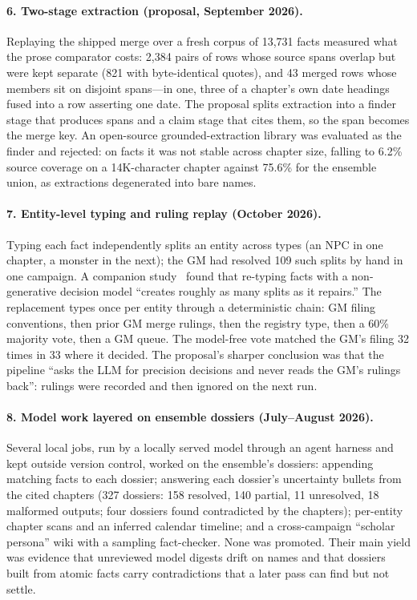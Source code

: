 \documentclass[11pt]{article}
\begin{document}
\paragraph{6. Two-stage extraction (proposal, September 2026).}
Replaying the shipped merge over a fresh corpus of 13{,}731 facts measured what the prose comparator
costs: 2{,}384 pairs of rows whose source spans overlap but were kept separate (821 with
byte-identical quotes), and 43 merged rows whose members sit on disjoint spans---in one, three of a
chapter's own date headings fused into a row asserting one date. The proposal splits extraction into a
finder stage that produces spans and a claim stage that cites them, so the span becomes the merge key.
An open-source grounded-extraction library was evaluated as the finder and rejected: on facts it was
not stable across chapter size, falling to 6.2\% source coverage on a 14K-character chapter against
75.6\% for the ensemble union, as extractions degenerated into bare names.

\paragraph{7. Entity-level typing and ruling replay (October 2026).}
Typing each fact independently splits an entity across types (an NPC in one chapter, a monster in the
next); the GM had resolved 109 such splits by hand in one campaign. A companion study~\cite{roussos2026decision}
found that re-typing facts with a non-generative decision model ``creates roughly as many splits as it
repairs.'' The replacement types once per entity through a deterministic chain: GM filing conventions,
then prior GM merge rulings, then the registry type, then a 60\% majority vote, then a GM queue. The
model-free vote matched the GM's filing 32 times in 33 where it decided. The proposal's sharper
conclusion was that the pipeline ``asks the LLM for precision decisions and never reads the GM's
rulings back'': rulings were recorded and then ignored on the next run.

\paragraph{8. Model work layered on ensemble dossiers (July--August 2026).}
Several local jobs, run by a locally served model through an agent harness and kept outside version
control, worked on the ensemble's dossiers: appending matching facts to each dossier; answering each
dossier's uncertainty bullets from the cited chapters (327 dossiers: 158 resolved, 140 partial, 11
unresolved, 18 malformed outputs; four dossiers found contradicted by the chapters); per-entity chapter
scans and an inferred calendar timeline; and a cross-campaign ``scholar persona'' wiki with a sampling
fact-checker. None was promoted. Their main yield was evidence that unreviewed model digests drift on
names and that dossiers built from atomic facts carry contradictions that a later pass can find but
not settle.
\end{document}
